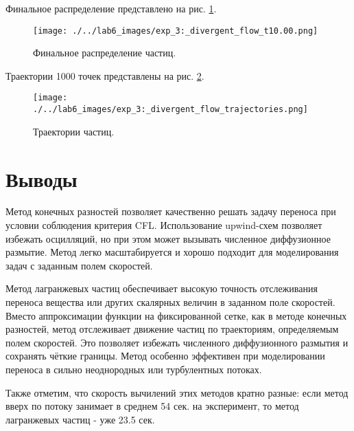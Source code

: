 \newpage
Финальное распределение представлено на рис. \ref{fig:lg_div_finall}.
\begin{figure}
	\centering
	\texttt{[image: ./../lab6\_images/exp\_3:\_divergent\_flow\_t10.00.png]}
	\caption{Финальное распределение частиц.}
	\label{fig:lg_div_finall}
\end{figure}

Траектории 1000 точек представлены на рис. \ref{fig:lg_div_tr}.

\begin{figure}[H]
	\centering
	\texttt{[image: ./../lab6\_images/exp\_3:\_divergent\_flow\_trajectories.png]}
	\caption{Траектории частиц.}
	\label{fig:lg_div_tr}
\end{figure}

\newpage


\section{Выводы}

Метод конечных разностей позволяет качественно решать задачу переноса при условии соблюдения критерия CFL. Использование upwind-схем позволяет избежать осцилляций, но при этом может вызывать численное диффузионное размытие. Метод легко масштабируется и хорошо подходит для моделирования задач с заданным полем скоростей.

Метод лагранжевых частиц обеспечивает высокую точность отслеживания переноса вещества или других скалярных величин в заданном поле скоростей. Вместо аппроксимации функции на фиксированной сетке, как в методе конечных разностей, метод отслеживает движение частиц по траекториям, определяемым полем скоростей. Это позволяет избежать численного диффузионного размытия и сохранять чёткие границы. Метод особенно эффективен при моделировании переноса в сильно неоднородных или турбулентных потоках.

Также отметим, что скорость вычилений этих методов кратно разные: если метод вверх по потоку занимает в среднем 54 сек. на эксперимент, то метод лагранжевых частиц - уже 23.5 сек.